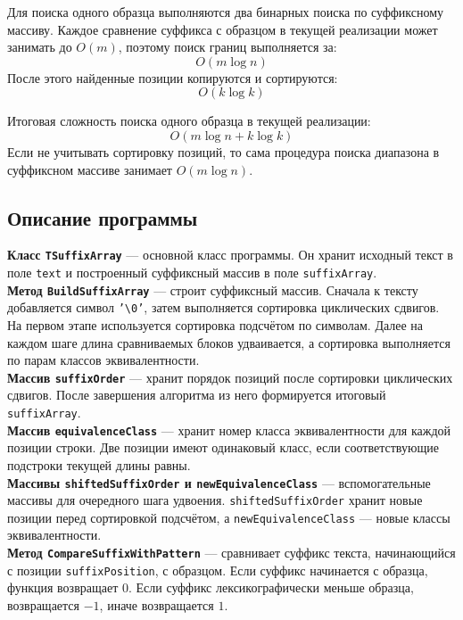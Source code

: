 \documentclass[12pt]{article}
\begin{document}
Для поиска одного образца выполняются два бинарных поиска по суффиксному массиву. Каждое сравнение суффикса с образцом в текущей реализации может занимать до $O(m)$, поэтому поиск границ выполняется за:
\[
O(m \log n)
\]
После этого найденные позиции копируются и сортируются:
\[
O(k \log k)
\]

Итоговая сложность поиска одного образца в текущей реализации:
\[
O(m \log n + k \log k)
\]
Если не учитывать сортировку позиций, то сама процедура поиска диапазона в суффиксном массиве занимает $O(m \log n)$.

\subsection*{Описание программы}
\hspace{2ex}
\textbf{Класс \texttt{TSuffixArray}} — основной класс программы. Он хранит исходный текст в поле \texttt{text} и построенный суффиксный массив в поле \texttt{suffixArray}. \\

\textbf{Метод \texttt{BuildSuffixArray}} — строит суффиксный массив. Сначала к тексту добавляется символ \texttt{'\textbackslash 0'}, затем выполняется сортировка циклических сдвигов. На первом этапе используется сортировка подсчётом по символам. Далее на каждом шаге длина сравниваемых блоков удваивается, а сортировка выполняется по парам классов эквивалентности. \\

\textbf{Массив \texttt{suffixOrder}} — хранит порядок позиций после сортировки циклических сдвигов. После завершения алгоритма из него формируется итоговый \texttt{suffixArray}. \\

\textbf{Массив \texttt{equivalenceClass}} — хранит номер класса эквивалентности для каждой позиции строки. Две позиции имеют одинаковый класс, если соответствующие подстроки текущей длины равны. \\

\textbf{Массивы \texttt{shiftedSuffixOrder} и \texttt{newEquivalenceClass}} — вспомогательные массивы для очередного шага удвоения. \texttt{shiftedSuffixOrder} хранит новые позиции перед сортировкой подсчётом, а \texttt{newEquivalenceClass} — новые классы эквивалентности. \\

\textbf{Метод \texttt{CompareSuffixWithPattern}} — сравнивает суффикс текста, начинающийся с позиции \texttt{suffixPosition}, с образцом. Если суффикс начинается с образца, функция возвращает $0$. Если суффикс лексикографически меньше образца, возвращается $-1$, иначе возвращается $1$. \\
\end{document}
